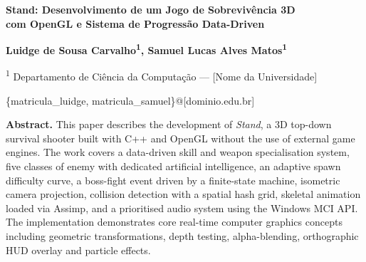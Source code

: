 \documentclass[12pt,a4paper]{article}
\begin{document}
\begin{center}
    {\fontsize{16}{20}\bfseries
    Stand: Desenvolvimento de um Jogo de Sobrevivência 3D\\
    com OpenGL e Sistema de Progressão Data-Driven\par}
    \vspace{12pt}

    {\fontsize{12}{14}\bfseries
    Luidge de Sousa Carvalho\textsuperscript{1},
    Samuel Lucas Alves Matos\textsuperscript{1}\par}
    \vspace{6pt}

    {\fontsize{12}{14}\selectfont
    \textsuperscript{1}%
    Departamento de Ciência da Computação —
    [Nome da Universidade]\par}
    \vspace{4pt}

    {\fontsize{10}{12}\ttfamily
    \{matricula\_luidge, matricula\_samuel\}@[dominio.edu.br]\par}
\end{center}

\vspace{10pt}

\noindent
\begin{minipage}[t]{\dimexpr\linewidth-1.6cm}
    \hspace{0.8cm}%
    \begin{minipage}[t]{\dimexpr\linewidth-0.8cm}
        \fontsize{12}{14}\selectfont
        \textbf{Abstract.} This paper describes the development of
        \textit{Stand}, a 3D top-down survival shooter built with C++ and
        OpenGL without the use of external game engines.
        The work covers a data-driven skill and weapon specialisation system,
        five classes of enemy with dedicated artificial intelligence, an
        adaptive spawn difficulty curve, a boss-fight event driven by a
        finite-state machine, isometric camera projection, collision detection
        with a spatial hash grid, skeletal animation loaded via Assimp, and a
        prioritised audio system using the Windows MCI API.
        The implementation demonstrates core real-time computer graphics
        concepts including geometric transformations, depth testing,
        alpha-blending, orthographic HUD overlay and particle effects.
    \end{minipage}
\end{minipage}
\end{document}
